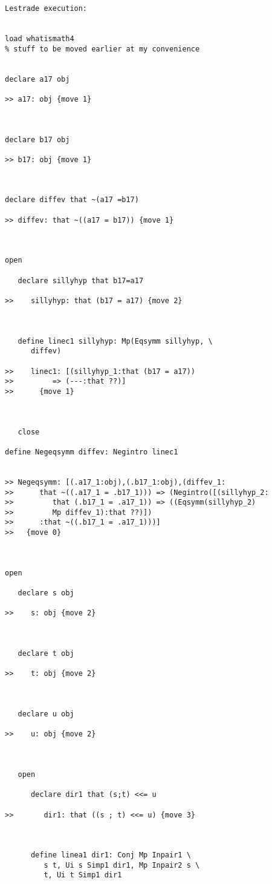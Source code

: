\documentclass[12pt]{article}
\begin{document}
\begin{verbatim}Lestrade execution:


load whatismath4
% stuff to be moved earlier at my convenience


declare a17 obj

>> a17: obj {move 1}



declare b17 obj

>> b17: obj {move 1}



declare diffev that ~(a17 =b17)

>> diffev: that ~((a17 = b17)) {move 1}



open

   declare sillyhyp that b17=a17

>>    sillyhyp: that (b17 = a17) {move 2}



   define linec1 sillyhyp: Mp(Eqsymm sillyhyp, \
      diffev)

>>    linec1: [(sillyhyp_1:that (b17 = a17))
>>         => (---:that ??)]
>>      {move 1}



   close

define Negeqsymm diffev: Negintro linec1


>> Negeqsymm: [(.a17_1:obj),(.b17_1:obj),(diffev_1:
>>      that ~((.a17_1 = .b17_1))) => (Negintro([(sillyhyp_2:
>>         that (.b17_1 = .a17_1)) => ((Eqsymm(sillyhyp_2)
>>         Mp diffev_1):that ??)])
>>      :that ~((.b17_1 = .a17_1)))]
>>   {move 0}



open

   declare s obj

>>    s: obj {move 2}



   declare t obj

>>    t: obj {move 2}



   declare u obj

>>    u: obj {move 2}



   open

      declare dir1 that (s;t) <<= u

>>       dir1: that ((s ; t) <<= u) {move 3}



      define linea1 dir1: Conj Mp Inpair1 \
         s t, Ui s Simp1 dir1, Mp Inpair2 s \
         t, Ui t Simp1 dir1


\end{verbatim}
\end{document}
